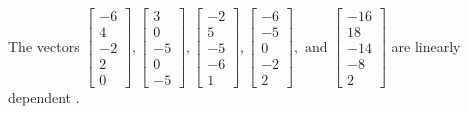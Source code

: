 \begin{exercise}
\begin{exerciseStatement}
  \end{exerciseStatement}
  \begin{exerciseAnswer}
   The vectors \(\left[\begin{array}{r}
-6 \\
4 \\
-2 \\
2 \\
0
\end{array}\right] , \left[\begin{array}{r}
3 \\
0 \\
-5 \\
0 \\
-5
\end{array}\right] , \left[\begin{array}{r}
-2 \\
5 \\
-5 \\
-6 \\
1
\end{array}\right] , \left[\begin{array}{r}
-6 \\
-5 \\
0 \\
-2 \\
2
\end{array}\right] , \text{ and } \left[\begin{array}{r}
-16 \\
18 \\
-14 \\
-8 \\
2
\end{array}\right]\) are 
  	 linearly dependent  .
  


  \end{exerciseAnswer}
\end{exercise}